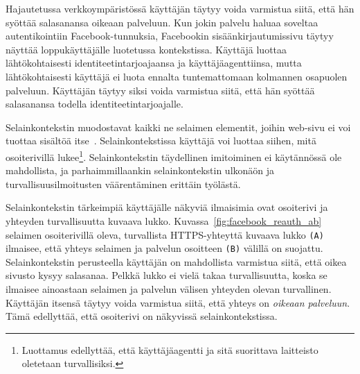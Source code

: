 \documentclass[finnish,gradu]{tktltiki}
\begin{document}
  Hajautetussa verkkoympäristössä käyttäjän täytyy voida varmistua siitä, että hän syöttää salasanansa oikeaan palveluun. Kun jokin palvelu haluaa soveltaa autentikointiin Facebook-tunnuksia, Facebookin sisäänkirjautumissivu täytyy näyttää loppukäyttäjälle luotetussa kontekstissa. Käyttäjä luottaa lähtökohtaisesti identiteetintarjoajaansa ja käyttäjäagenttiinsa, mutta lähtökohtaisesti käyttäjä ei luota ennalta tuntemattomaan kolmannen osapuolen palveluun. Käyttäjän täytyy siksi voida varmistua siitä, että hän syöttää salasanansa todella identiteetintarjoajalle.

  Selainkontekstin muodostavat kaikki ne selaimen elementit, joihin web-sivu ei voi tuottaa sisältöä itse~\cite{why_phishing_works_06}. Selainkontekstissa käyttäjä voi luottaa siihen, mitä osoiterivillä lukee\footnote{Luottamus edellyttää, että käyttäjäagentti ja sitä suorittava laitteisto oletetaan turvallisiksi.}. Selainkontekstin täydellinen imitoiminen ei käytännössä ole mahdollista, ja parhaimmillaankin selainkontekstin ulkonäön ja turvallisuusilmoitusten väärentäminen erittäin työlästä.

  Selainkontekstin tärkeimpiä käyttäjälle näkyviä ilmaisimia ovat osoiterivi ja yhteyden turvallisuutta kuvaava lukko. Kuvassa~\ref{fig:facebook_reauth_ab} selaimen osoiterivillä oleva, turvallista HTTPS-yhteyttä kuvaava lukko \verb!(A)! ilmaisee, että yhteys selaimen ja palvelun osoitteen \verb!(B)! välillä on suojattu. Selainkontekstin perusteella käyttäjän on mahdollista varmistua siitä, että oikea sivusto kysyy salasanaa. Pelkkä lukko ei vielä takaa turvallisuutta, koska se ilmaisee ainoastaan selaimen ja palvelun välisen yhteyden olevan turvallinen. Käyttäjän itsensä täytyy voida varmistua siitä, että yhteys on \emph{oikeaan palveluun}. Tämä edellyttää, että osoiterivi on näkyvissä selainkontekstissa.
\end{document}
